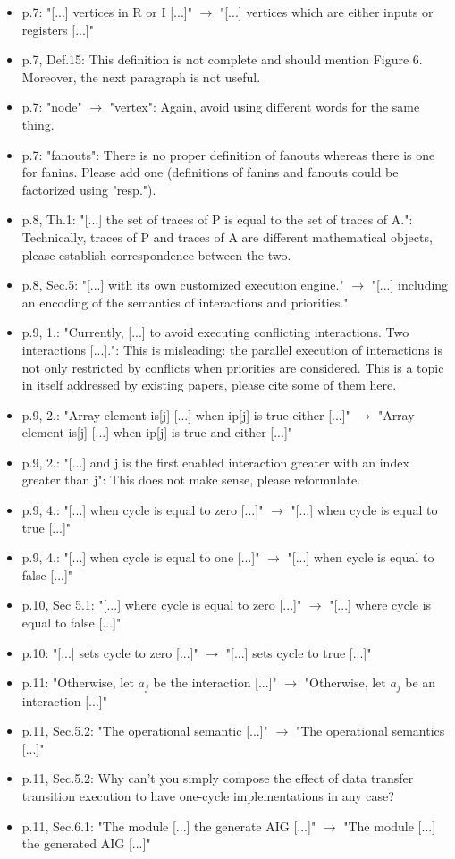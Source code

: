 \begin{itemize}
[...]"
\item p.7: "[...] vertices in R or I [...]" $\rightarrow$ "[...] vertices which are either 
inputs or registers [...]"
\item p.7, Def.15: This definition is not complete and should mention Figure 6. 
Moreover, the next paragraph is not useful.
\item p.7: "node" $\rightarrow$ "vertex": Again, avoid using different words for the same 
thing.
\item p.7: "fanouts": There is no proper definition of fanouts whereas there is 
one for fanins. Please add one (definitions of fanins and fanouts could be 
factorized using "resp.").
\item p.8, Th.1: "[...] the set of traces of P is equal to the set of traces of 
A.": Technically, traces of P and traces of A are different mathematical 
objects, please establish correspondence between the two.
\item p.8, Sec.5: "[...] with its own customized execution engine." $\rightarrow$ "[...] 
including an encoding of the semantics of interactions and priorities."
\item p.9, 1.: "Currently, [...] to avoid executing conflicting interactions. Two 
interactions [...].": This is misleading: the parallel execution of 
interactions is not only restricted by conflicts when priorities are 
considered. This is a topic in itself addressed by existing papers, please 
cite some of them here.
\item p.9, 2.: "Array element is[j] [...] when ip[j] is true either [...]" $\rightarrow$ 
"Array element is[j] [...] when ip[j] is true and either [...]"
\item p.9, 2.: "[...] and j is the first enabled interaction greater with an 
index greater than j": This does not make sense, please reformulate.
\item p.9, 4.: "[...] when cycle is equal to zero [...]" $\rightarrow$ "[...] when cycle is 
equal to true [...]"
\item p.9, 4.: "[...] when cycle is equal to one [...]" $\rightarrow$ "[...] when cycle is 
equal to false [...]"
\item p.10, Sec 5.1: "[...] where cycle is equal to zero [...]" $\rightarrow$ "[...] where 
cycle is equal to false [...]"
\item p.10: "[...] sets cycle to zero [...]" $\rightarrow$ "[...] sets cycle to true [...]"
\item p.11: "Otherwise, let $a_j$ be the interaction [...]" $\rightarrow$ "Otherwise, let $a_j$ 
be an interaction [...]"
\item p.11, Sec.5.2: "The operational semantic [...]" $\rightarrow$ "The operational 
semantics [...]"
\item p.11, Sec.5.2: Why can't you simply compose the effect of data transfer 
transition execution to have one-cycle implementations in any case?
\item p.11, Sec.6.1: "The module [...] the generate AIG [...]" $\rightarrow$ "The module 
[...] the generated AIG [...]"
\end{itemize}